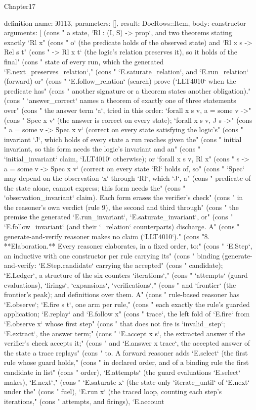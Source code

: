 \begin{lexlean}{Chapter17}
\begin{semanticmodule}
definition{
  name: i0113,
  parameters: [],
  result: DocRows::Item,
  body: constructor{
    arguments: [
      (cons "   a state, `Rl : (I, S) -> prop`, and two theorems stating exactly `Rl x" (cons "   o` (the predicate holds of the observed state) and `Rl x s -> Rel s t" (cons "   -> Rl x t` (the logic's relation preserves it), so it holds of the final" (cons "   state of every run, which the generated `E.next_preserves_relation`," (cons "   `E.saturate_relation`, and `E.run_relation` (forward) or" (cons "   `E.follow_relation` (search) prove (`LLT4010` when the predicate has" (cons "   another signature or a theorem states another obligation)." (cons "   `answer_correct` names a theorem of exactly one of three statements over" (cons "   the answer term `a`, tried in this order: `forall x s v, a = some v ->" (cons "   Spec x v` (the answer is correct on every state); `forall x s v, J s ->" (cons "   a = some v -> Spec x v` (correct on every state satisfying the logic's" (cons "   invariant `J`, which holds of every state a run reaches given the" (cons "   initial invariant, so this form needs the logic's invariant and an" (cons "   `initial_invariant` claim, `LLT4010` otherwise); or `forall x s v, Rl x" (cons "   s -> a = some v -> Spec x v` (correct on every state `Rl` holds of, so" (cons "   `Spec` may depend on the observation `x` through `Rl`, which `J`, a" (cons "   predicate of the state alone, cannot express; this form needs the" (cons "   `observation_invariant` claim). Each form erases the verifier's check" (cons "   in the reasoner's own verdict (rule 9), the second and third through" (cons "   the premise the generated `E.run_invariant`, `E.saturate_invariant`, or" (cons "   `E.follow_invariant` (and their `_relation` counterparts) discharge. A" (cons "   generate-and-verify reasoner makes no claim (`LLT4010`)." (cons "8. **Elaboration.** Every reasoner elaborates, in a fixed order, to:" (cons "   `E.Step`, an inductive with one constructor per rule carrying its" (cons "   binding (generate-and-verify: `E.Step.candidate` carrying the accepted" (cons "   candidate); `E.Ledger`, a structure of the six counters `iterations`," (cons "   `attempts` (guard evaluations), `firings`, `expansions`, `verifications`," (cons "   and `frontier` (the frontier's peak); and definitions over them. A" (cons "   rule-based reasoner has `E.observe`; `E.fire s t`, one arm per rule," (cons "   each exactly the rule's guarded application; `E.replay` and `E.follow x" (cons "   trace`, the left fold of `E.fire` from `E.observe x` whose first step" (cons "   that does not fire is `invalid_step`; `E.extract`, the answer term;" (cons "   `E.accept x s`, the extracted answer if the verifier's check accepts it;" (cons "   and `E.answer x trace`, the accepted answer of the state a trace replays" (cons "   to. A forward reasoner adds `E.select` (the first rule whose guard holds," (cons "   in declared order, and of a binding rule the first candidate in list" (cons "   order), `E.attempts` (the guard evaluations `E.select` makes), `E.next`," (cons "   `E.saturate x` (the state-only `iterate_until` of `E.next` under the" (cons "   fuel), `E.run x` (the traced loop, counting each step's iterations," (cons "   attempts, and firings), `E.account }}
\end{semanticmodule}
\end{lexlean}
